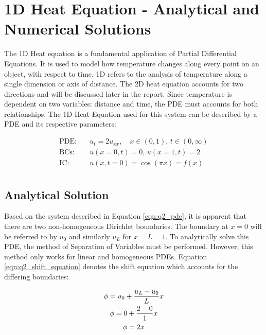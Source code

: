 \documentclass[12pt]{article}
\begin{document}
\clearpage
\section{1D Heat Equation - Analytical and Numerical Solutions}

The 1D Heat equation is a fundamental application of Partial Differential Equations. It is used to model how temperature changes along every point on an object, with respect to time. 1D refers to the analysis of temperature along a single dimension or axis of distance. The 2D heat equation accounts for two directions and will be discussed later in the report. Since temperature is dependent on two variables: distance and time, the PDE must accounts for both relationships. The 1D Heat Equation used for this system can be described by a PDE and its respective parameters:

\begin{equation}
    \label{eqn:q2_pde}
    \begin{aligned}
        \text{PDE:} & \quad u_t = 2 u_{xx}, \quad x \in \left(0, 1\right), \, t \in \left(0, \infty\right) \\
        \text{BCs:} & \quad u(x=0, t) = 0, \, u(x=1, t) = 2 \\
        \text{IC:}  & \quad u(x, t=0) = \cos(\pi x) = f(x) \\
    \end{aligned}
\end{equation}

\subsection{Analytical Solution}

Based on the system described in Equation \ref{eqn:q2_pde}, it is apparent that there are two non-homogeneous Dirichlet boundaries. The boundary at $x =0$ will be referred to by $u_0$ and similarly $u_L$ for $x = L = 1$. To analytically solve this PDE, the method of Separation of Variables must be performed. However, this method only works for linear and homogeneous PDEs. Equation \ref{eqn:q2_shift_equation} denotes the shift equation which accounts for the differing boundaries:

\begin{equation}
    \label{eqn:q2_shift_equation}
    \centering
    \begin{gathered}
        \phi = u_0 + \frac{u_L - u_0}{L} x \\
        \phi = 0 + \frac{2 - 0}{1} x \\
        \phi = 2x
    \end{gathered}
\end{equation}
\end{document}
